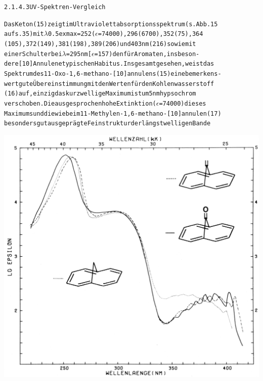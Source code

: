 \documentclass[a4paper,11pt]{article}
\begin{document}
\begin{alltt}



2.1.4.3 UV-Spektren-Vergleich

Das Keton (15) zeigt im Ultraviolettabsorptionsspektrum (s. Abb. 15
auf s. 35) mit \(\lambda\)\lower0.5ex\hbox{max} = 252 (\(\epsilon\) = 74000), 296 (6700), 352 (75), 364
(105), 372 (149), 381 (198), 389 (206) und 403 nm (216) sowie mit
einer Schulter bei \(\lambda\) = 295 nm [\(\epsilon\) = 157) den für Aromaten, insbeson-
dere [10]Annulene typischen Habitus. Insgesamt gesehen, weist das
Spektrum des 11-Oxo-1,6-methano-[10]annulens (15) eine bemerkens-
wert gute Übereinstimmung mit den Werten für den Kohlenwasserstoff
(16) auf, einzig das kurzwellige Maximum ist um 5 nm hypsochrom
verschoben. Die ausgesprochen hohe Extinktion (\(\epsilon\) = 74000) dieses
Maximums und die wie beim 11-Methylen-1,6-methano-[10]annulen (17)
besonders gut ausgeprägte Feinstruktur der längstwelligen Bande

\newpage
{}


\end{alltt}
\hspace*{-0.5cm}\includegraphics[width=15.25cm]{UV_015}
\end{document}

